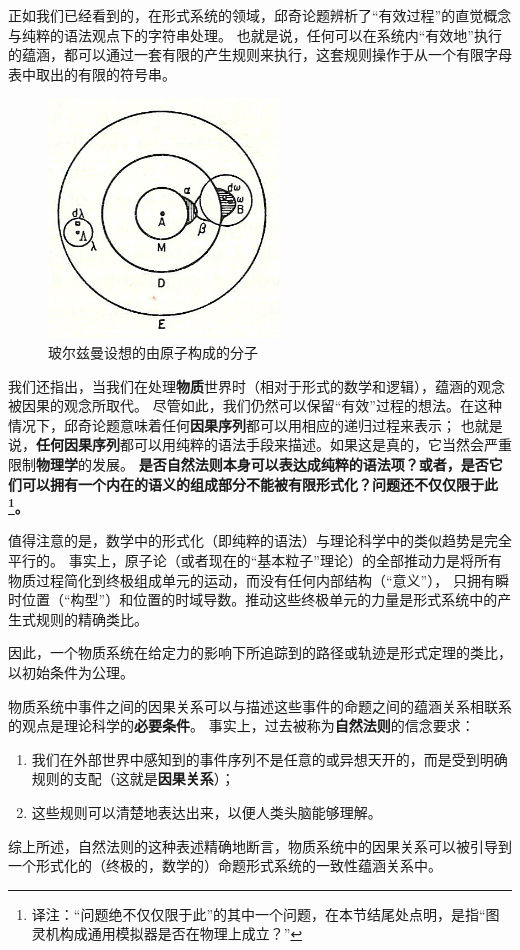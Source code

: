 \documentclass[a4paper,12pt]{article}
\begin{document}
正如我们已经看到的，在形式系统的领域，邱奇论题辨析了“有效过程”的直觉概念与纯粹的语法观点下的字符串处理。
也就是说，任何可以在系统内“有效地”执行的蕴涵，都可以通过一套有限的产生规则来执行，这套规则操作于从一个有限字母表中取出的有限的符号串。

\begin{figure}[ht]
\centering
\includegraphics[height=2.5in]{images/boltzmanns_molecule.jpg}
\caption{玻尔兹曼设想的由原子构成的分子}
\end{figure}

我们还指出，当我们在处理\textbf{物质}世界时（相对于形式的数学和逻辑），蕴涵的观念被因果的观念所取代。
尽管如此，我们仍然可以保留“有效”过程的想法。在这种情况下，邱奇论题意味着任何\textbf{因果序列}都可以用相应的递归过程来表示；
也就是说，\textbf{任何因果序列}都可以用纯粹的语法手段来描述。如果这是真的，它当然会严重限制\textbf{物理学}的发展。
\textbf{是否自然法则本身可以表达成纯粹的语法项？或者，是否它们可以拥有一个内在的语义的组成部分不能被有限形式化？问题还不仅仅限于此\footnote[1]{
译注：“问题绝不仅仅限于此”的其中一个问题，在本节结尾处点明，是指“图灵机构成通用模拟器是否在物理上成立？”}。}

值得注意的是，数学中的形式化（即纯粹的语法）与理论科学中的类似趋势是完全平行的。
事实上，原子论（或者现在的“基本粒子”理论）的全部推动力是将所有物质过程简化到终极组成单元的运动，而没有任何内部结构（“意义”），
只拥有瞬时位置（“构型”）和位置的时域导数。推动这些终极单元的力量是形式系统中的产生式规则的精确类比。

因此，一个物质系统在给定力的影响下所追踪到的路径或轨迹是形式定理的类比，以初始条件为公理。

物质系统中事件之间的因果关系可以与描述这些事件的命题之间的蕴涵关系相联系的观点是理论科学的\textbf{必要条件}。
事实上，过去被称为\textbf{自然法则}的信念要求：
\begin{enumerate}[label=(\alph*)]
\item 我们在外部世界中感知到的事件序列不是任意的或异想天开的，而是受到明确规则的支配（这就是\textbf{因果关系}）；
\item 这些规则可以清楚地表达出来，以便人类头脑能够理解。
\end{enumerate}
综上所述，自然法则的这种表述精确地断言，物质系统中的因果关系可以被引导到一个形式化的（终极的，数学的）命题形式系统的一致性蕴涵关系中。
\end{document}
